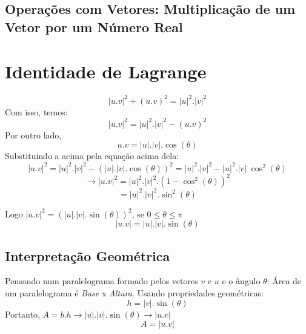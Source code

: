 \documentclass[ ]{article}
\begin{document}
		\subsection{Operações com Vetores: Multiplicação de um Vetor por um Número Real}
			







		
		
		
		
		
	\newpage %
	\section{Identidade de Lagrange}
		$$|u.v|^2 +(u.v)^2=|u|^2.|v|^2$$
		Com isso, temos:
		$$|u.v|^2=|u|^2.|v|^2-(u.v)^2$$
		Por outro lado,
		$$u.v=|u|.|v|.\cos(\theta)$$
		Substituindo a acima pela equação acima dela:
		$$|u.v|^2=|u|^2.|v|^2-(|u|.|v|.\cos(\theta))^2=|u|^2.|v|^2-|u|^2.|v|^.\cos^2(\theta)$$
		$$\to |u.v|^2 = |u|^2.|v|^2.(1-\cos^2(\theta))^2$$
		$$=|u|^2.|v|^2.\sin^2(\theta)$$
		
		Logo $|u.v|^2 = (|u|.|v|.\sin(\theta))^2$, se $0 \leq \theta \leq \pi$
		$$|u.v| = |u|.|v|.\sin(\theta)$$ %
		
		
		\subsection{Interpretação Geométrica}
			Pensando num paralelograma formado pelos vetores $v$ e $u$ e o ângulo $\theta$:
			Área de um paralelograma é \textit{Base} x \textit{Altura}. Usando propriedades geométricas:
			$$h=|v|.\sin(\theta)$$
			Portanto, $A=b.h \to |u|.|v|.\sin(\theta)\to |u.v|$
			$$A=|u.v|$$%
			
\end{document}
